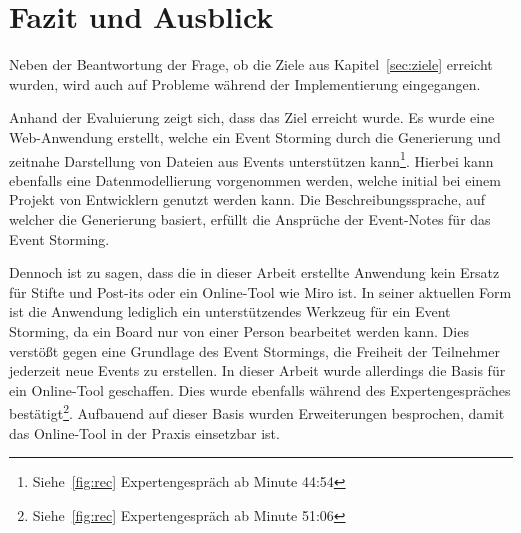 \chapter{Fazit und Ausblick}\label{ch:fazit}

Neben der Beantwortung der Frage, ob die Ziele aus Kapitel~\ref{sec:ziele} erreicht wurden, wird auch auf Probleme während
der Implementierung eingegangen.

Anhand der Evaluierung zeigt sich, dass das Ziel erreicht wurde.
Es wurde eine Web-Anwendung erstellt, welche ein Event Storming durch die Generierung und zeitnahe Darstellung von Dateien aus Events unterstützen kann\footnote{Siehe~\ref{fig:rec} Expertengespräch ab Minute  44:54}.
Hierbei kann ebenfalls eine Datenmodellierung vorgenommen werden, welche initial bei einem Projekt von Entwicklern genutzt werden kann.
Die Beschreibungssprache, auf welcher die Generierung basiert, erfüllt die Ansprüche der Event-Notes für das Event Storming.

Dennoch ist zu sagen, dass die in dieser Arbeit erstellte Anwendung kein Ersatz für Stifte und Post-its oder ein Online-Tool wie Miro ist.
In seiner aktuellen Form ist die Anwendung lediglich ein unterstützendes Werkzeug für ein Event Storming, da ein Board nur von einer Person bearbeitet werden kann.
Dies verstößt gegen eine Grundlage des Event Stormings, die Freiheit der Teilnehmer jederzeit neue Events zu erstellen.
In dieser Arbeit wurde allerdings die Basis für ein Online-Tool geschaffen.
Dies wurde ebenfalls während des Expertengespräches bestätigt\footnote{Siehe~\ref{fig:rec} Expertengespräch ab Minute  51:06}.
Aufbauend auf dieser Basis wurden Erweiterungen besprochen, damit das Online-Tool in der Praxis einsetzbar ist.

